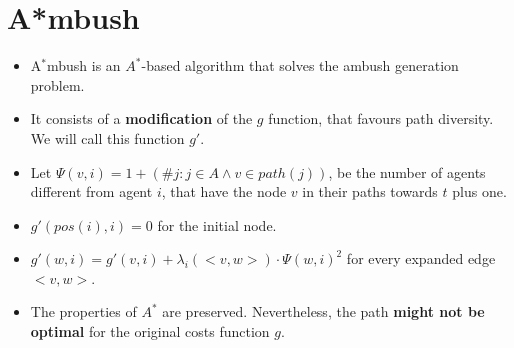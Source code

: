 \begin{minipage}{0.3\textwidth}
\section*{A*mbush}

\begin{itemize}

\item A$^*$mbush is an $A^*$-based algorithm that solves the
ambush generation problem. 

\item It consists of a \textbf{modification} of the $g$ function,
that favours path diversity. We will call this function $g'$.

\item Let $\Psi(v,i) = 1+(\# j : j \in A \wedge v \in path(j))$,
be the number of agents different from agent $i$, that have the 
node $v$ in their paths towards $t$ plus one.

\item $g'(pos(i),i) = 0$ for the initial node.

\item $g'(w, i) = g'(v,i) + \lambda_i(<v,w>) \cdot \Psi(w,i)^2$
for every expanded edge $<v,w>$.

\item The properties of $A^*$ are preserved. Nevertheless, the path
\textbf{might not be optimal} for the original costs function $g$.

\end{itemize}

\end{minipage}